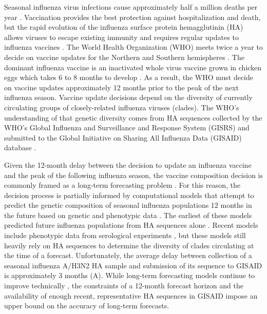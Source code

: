 \documentclass[9pt,lineno]{elife}
\begin{document}
Seasonal influenza virus infections cause approximately half a million deaths per year \citep{flufactsheet}.
Vaccination provides the best protection against hospitalization and death, but the rapid evolution of the influenza surface protein hemagglutinin (HA) allows viruses to escape existing immunity and requires regular updates to influenza vaccines \citep{Petrova2018}.
The World Health Organization (WHO) meets twice a year to decide on vaccine updates for the Northern and Southern hemispheres \citep{Morris2018}.
The dominant influenza vaccine is an inactivated whole virus vaccine grown in chicken eggs \citep{Wong2013} which takes 6 to 8 months to develop \citep{Morris2018}.
As a result, the WHO must decide on vaccine updates approximately 12 months prior to the peak of the next influenza season.
Vaccine update decisions depend on the diversity of currently circulating groups of closely-related influenza viruses (clades).
The WHO's understanding of that genetic diversity comes from HA sequences collected by the WHO's Global Influenza and Surveillance and Response System (GISRS) \citep{Hay2018} and submitted to the Global Initiative on Sharing All Influenza Data (GISAID) database \citep{gisaid}.

Given the 12-month delay between the decision to update an influenza vaccine and the peak of the following influenza season, the vaccine composition decision is commonly framed as a long-term forecasting problem \citep{Lassig2017}.
For this reason, the decision process is partially informed by computational models that attempt to predict the genetic composition of seasonal influenza populations 12 months in the future based on genetic and phenotypic data \citep{Morris2018}.
The earliest of these models predicted future influenza populations from HA sequences alone \citep{Luksza:2014hj,Neher:2014eu,Steinbruck2014}.
Recent models include phenotypic data from serological experiments \citep{Morris2018,Huddleston2020}, but these models still heavily rely on HA sequences to determine the diversity of clades circulating at the time of a forecast.
Unfortunately, the average delay between collection of a seasonal influenza A/H3N2 HA sample and submission of its sequence to GISAID is approximately 3 months (A).
While long-term forecasting models continue to improve technically \citep{Meijers2023}, the constraints of a 12-month forecast horizon and the availability of enough recent, representative HA sequences in GISAID impose an upper bound on the accuracy of long-term forecasts.
\end{document}

